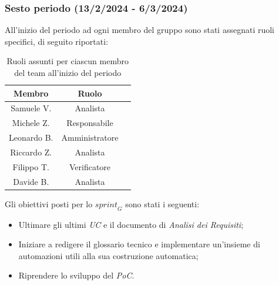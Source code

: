 \subsubsection{Sesto periodo (13/2/2024 - 6/3/2024)}
All'inizio del periodo ad ogni membro del gruppo sono stati assegnati ruoli specifici, di seguito riportati:
\begin{table}[H]
\centering
\begin{tabular}{|c|c|c|}
\hline
\textbf{Membro} & \textbf{Ruolo} \\
\hline
Samuele V. & Analista \\
\hline
Michele Z. & Responsabile \\
\hline
Leonardo B. & Amministratore \\
\hline
Riccardo Z. & Analista \\
\hline
Filippo T. & Verificatore \\
\hline
Davide B. & Analista \\
\hline
\end{tabular}
\caption{Ruoli assunti per ciascun membro del team all'inizio del periodo}
\end{table}

Gli obiettivi posti per lo $\textit{sprint}_G$ sono stati i seguenti:
\begin{itemize}
    \item Ultimare gli ultimi \emph{UC} e il documento di \emph{Analisi dei Requisiti};
    \item Iniziare a redigere il glossario tecnico e implementare un'insieme di automazioni utili alla sua costruzione automatica;
    \item Riprendere lo sviluppo del \emph{PoC}.
\end{itemize}


